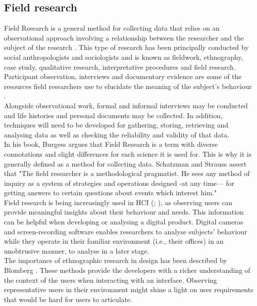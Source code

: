 \subsection{Field research}
Field Research is a general method for collecting data that relies on an observational approach involving a relationship between the researcher and the subject of the research \cite{Burgess2003-oy}. This type of research has been principally conducted by social anthropologists and sociologists and is known as fieldwork, ethnography, case study, qualitative research, interpretative procedures and field research.  Participant observation, interviews and documentary evidence are some of the resources field researchers use to elucidate the meaning of the subject's behaviour \cite{Burgess2003-oy}.\\
Alongside observational work, formal and informal interviews may be conducted and life histories and personal documents may be collected. In addition, techniques will need to be developed for gathering, storing, retrieving and analysing data as well as checking the reliability and validity of that data.\\
In his book, Burgess \cite{Burgess2003-oy} argues that Field Research is a term with diverse connotations and slight differences for each science it is used for. This is why it is generally defined as a method for collecting data. Schatzman and Strauss assert that "The field researcher is a methodological pragmatist. He sees any method of inquiry as a system of strategies and operations designed -at any time— for getting answers to certain questions about events which interest him." \cite{Schatzman1972-zz}\\
Field research is being increasingly used in HCI (\cite{Millen_undated-et}; \cite{Pensabe-Rodriguez2020-qs}), as observing users can provide meaningful insights about their behaviour and needs. This information can be helpful when developing or analysing a digital product. Digital cameras and screen-recording software enables researchers to analyse subjects' behaviour while they operate in their familiar environment (i.e., their offices) in an unobtrusive manner, to analyse in a later stage.\\
The importance of ethnographic research in design has been described by Blomberg \cite{Schuler2017-ka}. These methods provide the developers with a richer understanding of the context of the users when interacting with an interface. Observing representative users in their environment might shine a light on user requirements that would be hard for users to articulate.
